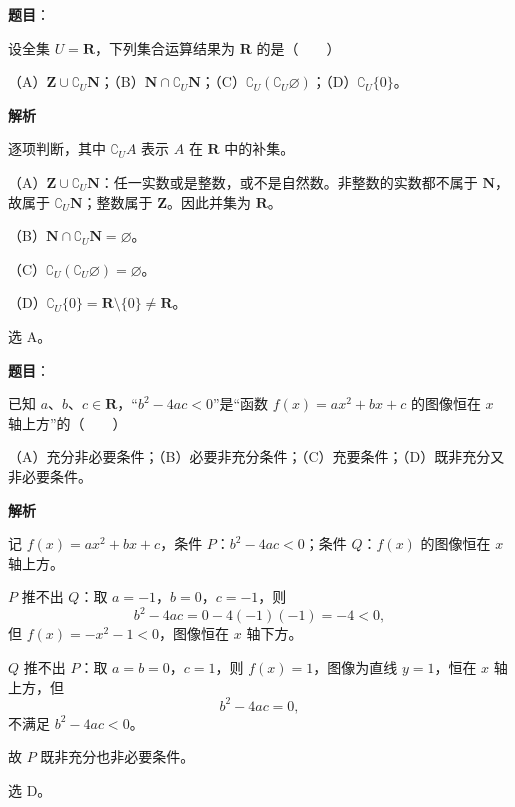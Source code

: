 \begin{answer}

\textbf{题目}：

设全集 $U=\mathbf R$，下列集合运算结果为 $\mathbf R$ 的是\mbox{（　　）}

（A）$\mathbf Z\cup\complement_U\mathbf N$；（B）$\mathbf N\cap\complement_U\mathbf N$；（C）$\complement_U(\complement_U\varnothing)$；（D）$\complement_U\{0\}$。

\textbf{解析}

逐项判断，其中 $\complement_U A$ 表示 $A$ 在 $\mathbf R$ 中的补集。

（A）$\mathbf Z\cup\complement_U\mathbf N$：任一实数或是整数，或不是自然数。非整数的实数都不属于 $\mathbf N$，故属于 $\complement_U\mathbf N$；整数属于 $\mathbf Z$。因此并集为 $\mathbf R$。

（B）$\mathbf N\cap\complement_U\mathbf N=\varnothing$。

（C）$\complement_U(\complement_U\varnothing)=\varnothing$。

（D）$\complement_U\{0\}=\mathbf R\setminus\{0\}\neq\mathbf R$。

选 A。


\end{answer}
\begin{answer}

\textbf{题目}：

已知 $a$、$b$、$c\in\mathbf R$，“$b^2-4ac<0$”是“函数 $f(x)=ax^2+bx+c$ 的图像恒在 $x$ 轴上方”的\mbox{（　　）}

（A）充分非必要条件；（B）必要非充分条件；（C）充要条件；（D）既非充分又非必要条件。

\textbf{解析}

记 $f(x)=ax^2+bx+c$，条件 $P$：$b^2-4ac<0$；条件 $Q$：$f(x)$ 的图像恒在 $x$ 轴上方。

$P$ 推不出 $Q$：取 $a=-1$，$b=0$，$c=-1$，则
\nopagebreak[4]
\[b^2-4ac=0-4(-1)(-1)=-4<0,\]
但 $f(x)=-x^2-1<0$，图像恒在 $x$ 轴下方。

$Q$ 推不出 $P$：取 $a=b=0$，$c=1$，则 $f(x)=1$，图像为直线 $y=1$，恒在 $x$ 轴上方，但
\nopagebreak[4]
\[b^2-4ac=0,\]
不满足 $b^2-4ac<0$。

故 $P$ 既非充分也非必要条件。

选 D。


\end{answer}
